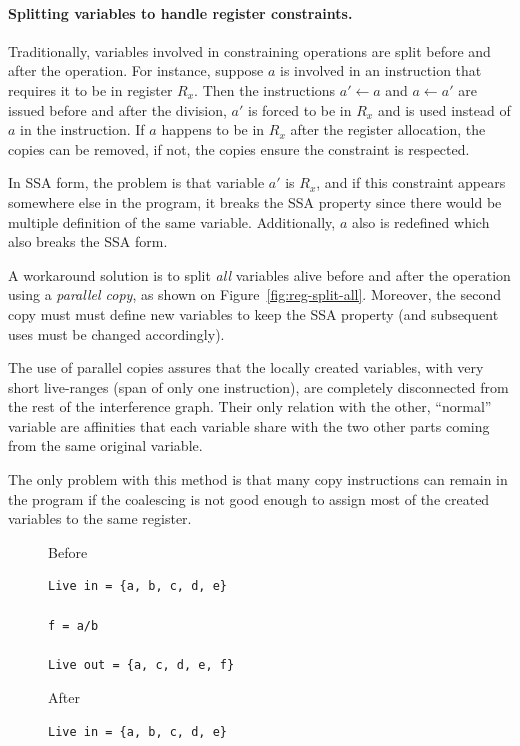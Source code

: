 {\paragraph{Splitting variables to handle register constraints.}

Traditionally, variables involved in constraining operations are split before and after the operation.
For instance, suppose $a$ is involved in an instruction that requires it to be in register $R_x$.
Then the instructions $a'\gets a$ and $a\gets a'$ are issued before and after the division,
$a'$ is forced to be in $R_x$ and is used instead of $a$ in the instruction.
If $a$ happens to be in $R_x$ after the register allocation, the copies can be removed, if not, the copies ensure the constraint is respected.

In SSA form, the problem is that variable $a'$ is $R_x$, and if this constraint appears somewhere else in the program, it breaks the SSA property since there would be multiple definition of the same variable.
Additionally, $a$ also is redefined which also breaks the SSA form.

A workaround solution is to split \emph{all} variables alive before and 
after the operation using a \emph{parallel copy}, as shown on Figure~\ref{fig:reg-split-all}.
Moreover, the second copy must must define new variables to keep the SSA property (and subsequent uses must be changed accordingly).

The use of parallel copies assures that the locally created variables, with very short live-ranges (span of only one instruction), are completely disconnected from the rest of the interference graph.
Their only relation with the other, ``normal'' variable are affinities that each 
variable share with the two other parts coming from the same original variable.

The only problem with this method is that many copy instructions can remain in the program if the coalescing is not good enough to assign most of the created variables to the same register.  

\begin{figure}
  \begin{minipage}{.39\textwidth}
  \begin{center}
    Before
      \begin{verbatim}
Live in = {a, b, c, d, e}

f = a/b

Live out = {a, c, d, e, f}

      \end{verbatim}
  \end{center}
  \end{minipage}
  \begin{minipage}{.6\textwidth}
  \begin{center}
    After
      \begin{verbatim}
Live in = {a, b, c, d, e}


\end{verbatim}
\end{center}
\end{minipage}
\end{figure}}
